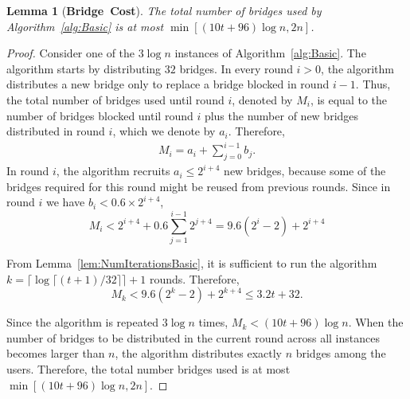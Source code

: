 \documentclass[letterpaper,twocolumn,10pt]{article}
\newtheorem{lemma}{Lemma}
\newcommand{\sfsize}{\fontsize{0.68\baselineskip}{0.68\baselineskip}\selectfont}
\newcommand{\sans}[1]{\textbf{\textsf{\sfsize \mbox{#1}}}}
\begin{document}
\begin{lemma}[\sans{Bridge Cost}] \label{lem:NumBridgesBasic}
	The total number of bridges used by Algorithm~\ref{alg:Basic} is at most $\min\left[{(10t + 96)\log{n}}, 2n\right]$. %
\end{lemma}
\begin{proof}
	Consider one of the $3\log{n}$ instances of Algorithm~\ref{alg:Basic}. The algorithm starts by distributing  $32$ bridges. In every round ${i > 0}$, the algorithm distributes a new bridge only to replace a bridge blocked in round ${i-1}$. Thus, the total number of bridges used until round $i$, denoted by $M_i$, is equal to the number of bridges blocked until round $i$ plus the number of new bridges distributed in round $i$, which we denote by $a_i$. Therefore,
	\begin{align}
	M_i = a_i + \sum_{j=0}^{i-1} b_j. \label{eq:NumBridges}
	\end{align}
	In round $i$, the algorithm recruits ${a_i \leq 2^{i+4}}$ new bridges, because some of the bridges required for this round might be reused from previous rounds. Since in round $i$ we have ${b_i < 0.6 \times 2^{i+4}}$,
	\[M_i < 2^{i+4} + 0.6\sum_{j=1}^{i-1} 2^{j+4} = 9.6(2^i - 2) + 2^{i+4}\]
	
	From Lemma~\ref{lem:NumIterationsBasic}, it is sufficient to run the algorithm ${k = \lceil \log{\lceil (t+1)/32 \rceil} \rceil + 1}$ rounds. Therefore,	
	\[M_k < 9.6(2^k - 2) + 2^{k+4} \leq 3.2t + 32.\]
	
	Since the algorithm is repeated $3\log{n}$ times, $M_k < {(10t + 96)\log{n}}$. When the number of bridges to be distributed in the current round across all instances becomes larger than $n$, the algorithm distributes exactly $n$ bridges among the users. Therefore, the total number bridges used is at most $\min\left[{(10t + 96)\log{n}}, 2n\right]$. %
\end{proof}
\end{document}

